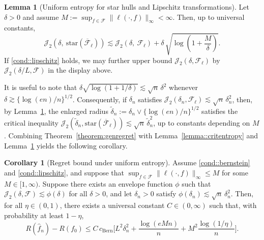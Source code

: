 \documentclass[11pt]{article}
\theoremstyle{plain}
\theoremstyle{definition} %
\newtheorem{corollary}{Corollary}
\newtheorem{lemma}{Lemma}
\begin{document}
\begin{lemma}[Uniform entropy for star hulls and Lipschitz transformations]
\label{lemma::starentropybounds}
Let $\delta > 0$ and assume $M :=  \sup_{f \in \mathcal{F}}\|\ell(\cdot, f)\|_{\infty} < \infty$. Then, up to universal constants,
\[
\mathcal J_2\left(\delta,\ \mathrm{star}(\overline{\mathcal{F}}_{\ell})\right)
\lesssim
\mathcal J_2\left(\delta,\ \mathcal{F}_{\ell}\right)
+
\delta\,\sqrt{\log\left(1+\frac{M}{\delta}\right)}.
\]
If \ref{cond::lipschitz} holds, we may further upper bound
$\mathcal J_2(\delta,\mathcal F_\ell)$ by $\mathcal J_2(\delta/L,\mathcal F)$ in the display above.
\end{lemma}


It is useful to note that \(\delta\sqrt{\log(1+1/\delta)} \lesssim \sqrt n\,\delta^2\) whenever \(\delta \gtrsim \{\log(e n)/n\}^{1/2}\). Consequently, if \(\delta_n\) satisfies \(\mathcal J_2(\delta_n,\mathcal F_{\ell}) \lesssim \sqrt n\,\delta_n^2\), then, by Lemma~\ref{lemma::starentropybounds}, the enlarged radius \(\widetilde{\delta}_n := \delta_n \vee \{\log(en)/n\}^{1/2}\) satisfies the critical inequality \(\mathcal J_2(\widetilde{\delta}_n,\mathrm{star}(\overline{\mathcal F}_{\ell})) \lesssim \sqrt n\,\widetilde{\delta}_n^2\), up to constants depending on $M$. Combining Theorem~\ref{theorem:genregret} with Lemma~\ref{lemma::critentropy} and Lemma~\ref{lemma::starentropybounds} yields the following corollary.




\begin{corollary}[Regret bound under uniform entropy]
\label{cor:regretentropy}
Assume \ref{cond::bernstein} and \ref{cond::lipschitz}, and suppose that
\(\sup_{f \in \mathcal{F}} \|\ell(\cdot, f)\|_{\infty} \leq M\) for some \(M \in [1, \infty)\).
Suppose there exists an envelope function \(\phi\) such that
\(\mathcal{J}_2(\delta,\mathcal{F}) \lesssim \phi(\delta)\) for all \(\delta>0\), and let \(\delta_n>0\)
satisfy \(\phi(\delta_n)\lesssim \sqrt{n}\,\delta_n^2\). Then, for all \(\eta \in (0,1)\), there exists
a universal constant \(C\in(0,\infty)\) such that, with probability at least \(1-\eta\),
\[
R(\hat f_n)-R(f_0)
\le
C\,c_{\mathrm{Bern}}\Biggl[
L^2 \delta_n^2
+ {\frac{\log (e Mn)}{n}}
+ M^2\frac{\log(1/\eta)}{n}
\Biggr].
\]
\end{corollary}
 
\end{document}
